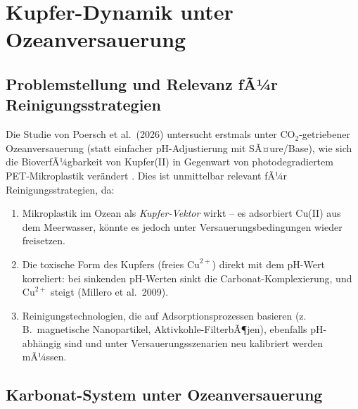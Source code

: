 ﻿\documentclass[12pt,a4paper]{article}
\theoremstyle{definition}
\theoremstyle{remark}
\newcommand{\MP}{Mikroplastik}
\begin{document}
\section{Kupfer-Dynamik unter Ozeanversauerung}
\label{sec:kupfer_dynamik}

\subsection{Problemstellung und Relevanz fÃ¼r Reinigungsstrategien}

Die Studie von Poersch et al.\ (2026) untersucht erstmals unter CO$_2$-getriebener
Ozeanversauerung (statt einfacher pH-Adjustierung mit SÃ¤ure/Base), wie sich die
BioverfÃ¼gbarkeit von Kupfer(II) in Gegenwart von photodegradiertem PET-Mikroplastik
ver\"andert \cite{poersch2026copper}. Dies ist unmittelbar relevant fÃ¼r
Reinigungsstrategien, da:

\begin{enumerate}[leftmargin=*]
  \item \MP{} im Ozean als \textit{Kupfer-Vektor} wirkt -- es adsorbiert Cu(II)
    aus dem Meerwasser, k\"onnte es jedoch unter Versauerungsbedingungen
    wieder freisetzen.
  \item Die toxische Form des Kupfers (freies $\text{Cu}^{2+}$) direkt mit
    dem pH-Wert korreliert: bei sinkenden pH-Werten sinkt die Carbonat-Komplexierung,
    und $\text{Cu}^{2+}$ steigt (Millero et al.\ 2009).
  \item Reinigungstechnologien, die auf Adsorptionsprozessen basieren (z.\,B.\
    magnetische Nanopartikel, Aktivkohle-FilterbÃ¶jen), ebenfalls pH-abh\"angig
    sind und unter Versauerungsszenarien neu kalibriert werden mÃ¼ssen.
\end{enumerate}

\subsection{Karbonat-System unter Ozeanversauerung}
\label{subsec:karbonat}
\end{document}
